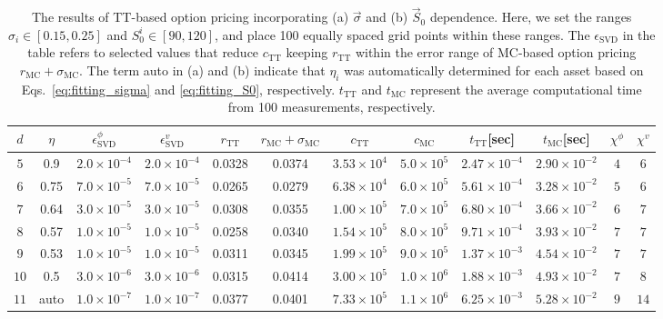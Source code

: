 \begin{table*}[htbp]
\begin{subtable}[h]{0.9\textwidth}
\centering
\caption{$\vec{S}_0$}
\begin{tabular}{|c|c|c|c|c|c|c|c|c|c|c|c|}
    \hline
    $d$ & $\eta$ & $\epsilon_{\mathrm{SVD}}^\phi$ & $\epsilon_{\mathrm{SVD}}^v$ & $r_{\mathrm{TT}}$ & $r_{\mathrm{MC}} + \sigma_{\text{MC}}$ & {$c_{\mathrm{TT}}$} & {$c_{\mathrm{MC}}$} & {$t_{\mathrm{TT}}$[sec]} & {$t_{\mathrm{MC}}$[sec]} &
    {$\chi^{\phi}_{\mathrm{}}$} &
    {$\chi^{v}_{\mathrm{}}$} \\
    \hline
    $5$ & 0.9 & $2.0 \times 10^{-4}$ & $2.0 \times 10^{-4}$ & 0.0328 & 0.0374 & $3.53 \times 10^4$ & $5.0 \times 10^5$ & $2.47 \times 10^{-4}$ & $2.90 \times 10^{-2}$ &
    $4$ & $6$\\
    \hline
    $6$ & 0.75 & $7.0 \times 10^{-5}$ & $7.0 \times 10^{-5}$ & 0.0265 & 0.0279 & $6.38 \times 10^4$ & $6.0 \times 10^5$ & $5.61 \times 10^{-4}$ & $3.28 \times 10^{-2}$ & $5$ & $6$\\
    \hline
    $7$ & 0.64 & $3.0 \times 10^{-5}$ & $3.0 \times 10^{-5}$ & 0.0308 & 0.0355 & $1.00 \times 10^5$ & $7.0 \times 10^5$ & $6.80 \times 10^{-4}$ & $3.66 \times 10^{-2}$ & $6$ & $7$\\
    \hline
    $8$ & 0.57 & $1.0 \times 10^{-5}$ & $1.0 \times 10^{-5}$ & 0.0258 & 0.0340 & $1.54 \times 10^5$ & $8.0 \times 10^5$ & $9.71 \times 10^{-4}$ & $3.93 \times 10^{-2}$ & $7$ & $7$\\
    \hline
    $9$ & 0.53 & $1.0 \times 10^{-5}$ & $1.0 \times 10^{-5}$ & 0.0311 & 0.0345 & $1.99 \times 10^5$ & $9.0 \times 10^5$ & $1.37 \times 10^{-3}$ & $4.54 \times 10^{-2}$ & $7$ & $7$\\
    \hline
    $10$ & 0.5 & $3.0 \times 10^{-6}$ & $3.0 \times 10^{-6}$ & 0.0315 & 0.0414 & $3.00 \times 10^5$ & $1.0 \times 10^6$ & $1.88 \times 10^{-3}$ & $4.93 \times 10^{-2}$ & $7$ & $8$\\
    \hline
    $11$ & auto & $1.0 \times 10^{-7}$ & $1.0 \times 10^{-7}$ & 0.0377 & 0.0401 & $7.33 \times 10^5$ & $1.1 \times 10^6$ & $6.25 \times 10^{-3}$ & $5.28 \times 10^{-2}$ & $9$ & $14$\\
    \hline
\end{tabular}
\end{subtable}

\caption{
        The results of TT-based option pricing incorporating (a) $\vec{\sigma}$ and (b) $\vec{S}_0$ dependence.
        Here, we set the ranges $\sigma_i \in [0.15, 0.25]$ and $S_0^i \in [90, 120]$, and place 100 equally spaced grid points within these ranges.
        The $\epsilon_{\mathrm{SVD}}$ in the table refers to selected values that reduce $c_{\mathrm{TT}}$ keeping $r_{\mathrm{TT}}$ within the error range of MC-based option pricing $r_{\mathrm{MC}} + \sigma_{\text{MC}}$.
        The term auto in (a) and (b) indicate that $\eta_{i}$ was automatically determined for each asset based on Eqs.~\eqref{eq:fitting_sigma} and \eqref{eq:fitting_S0}, respectively.
        $t_{\mathrm{TT}}$ and $t_{\mathrm{MC}}$ represent the average computational time from 100 measurements, respectively.
}
\label{table:table_res}
\end{table*}



